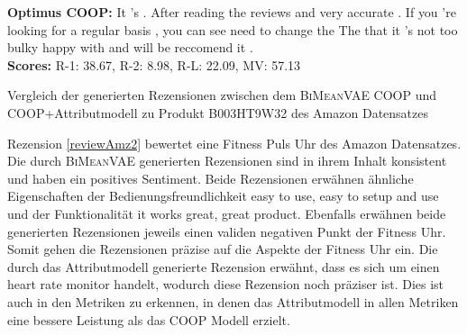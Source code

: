 \begin{Rezension}[!h]
{{        \textbf{Optimus COOP:} \textcolor{HighlightColor}{It} 's \ccolorbox[BackgroundColor]{ \textcolor{HighlightColor}{\strut very} \underline{\textcolor{HighlightColor}{easy}}}\underline{ \ccolorbox[BackgroundColor]{ \textcolor{HighlightColor}{\strut to use}}} \textcolor{HighlightColor}{.} After reading \textcolor{HighlightColor}{the} reviews \textcolor{HighlightColor}{and} \ccolorbox[BackgroundColor]{ \textcolor{HighlightColor}{\strut it is}} \textcolor{HighlightColor}{very} \textcolor{HighlightColor}{accurate} \textcolor{HighlightColor}{.} If \textcolor{HighlightColor}{you} 're looking \textcolor{HighlightColor}{for} \textcolor{HighlightColor}{a} regular basis \textcolor{HighlightColor}{,} \textcolor{HighlightColor}{you} \textcolor{HighlightColor}{can} see \ccolorbox[BackgroundColor]{ \textcolor{HighlightColor}{\strut if you}} \textcolor{HighlightColor}{need} \textcolor{HighlightColor}{to} change \textcolor{HighlightColor}{the} \ccolorbox[BackgroundColor]{ \textcolor{HighlightColor}{\strut monitor .}} \textcolor{HighlightColor}{The} \ccolorbox[BackgroundColor]{ \textcolor{HighlightColor}{\strut monitor is}} \textcolor{HighlightColor}{that} \textcolor{HighlightColor}{it} 's \textcolor{HighlightColor}{not} too bulky \ccolorbox[BackgroundColor]{ \textcolor{HighlightColor}{\strut . Very}} happy \textcolor{HighlightColor}{with} \ccolorbox[BackgroundColor]{ \textcolor{HighlightColor}{\strut this product}} \textcolor{HighlightColor}{and} \textcolor{HighlightColor}{will} \textcolor{HighlightColor}{be} reccomend \textcolor{HighlightColor}{it} \textcolor{HighlightColor}{.}  \\ 
        \textbf{Scores:} R-1: 38.67, R-2: 8.98, R-L: 22.09, MV: 57.13 }
    
    }
    \caption{Vergleich der generierten Rezensionen zwischen dem \textsc{BiMeanVAE} COOP und COOP+Attributmodell zu Produkt B003HT9W32 des Amazon Datensatzes}
    \label{reviewAmz2}
\end{Rezension}


Rezension \ref{reviewAmz2} bewertet eine Fitness Puls Uhr des Amazon Datensatzes.
Die durch \textsc{BiMeanVAE} generierten Rezensionen sind in ihrem Inhalt konsistent und haben ein positives Sentiment. 
Beide Rezensionen erwähnen ähnliche Eigenschaften der Bedienungsfreundlichkeit \glqq{}easy to use\grqq{}, \glqq{}easy to setup and use\grqq{} und der Funktionalität \glqq{}it works great\grqq{}, \glqq{}great product\grqq{}.
Ebenfalls erwähnen beide generierten Rezensionen jeweils einen validen negativen Punkt der Fitness Uhr.
Somit gehen die Rezensionen präzise auf die Aspekte der Fitness Uhr ein. 
Die durch das Attributmodell generierte Rezension erwähnt, dass es sich um einen \glqq{}heart rate monitor\grqq{} handelt, wodurch diese Rezension noch präziser ist.
Dies ist auch in den Metriken zu erkennen, in denen das Attributmodell in allen Metriken eine bessere Leistung als das COOP Modell erzielt.

